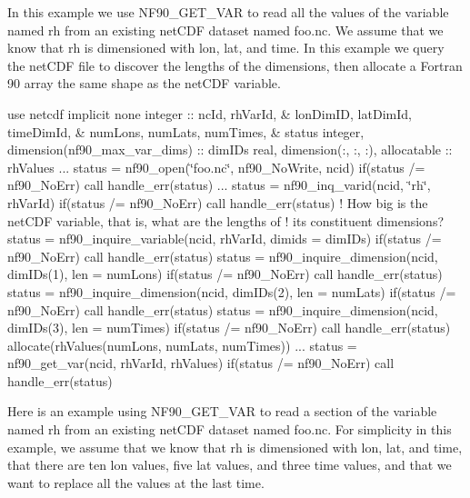In this example we use N\+F90\+\_\+\+G\+E\+T\+\_\+\+V\+AR to read all the values of the variable named rh from an existing net\+C\+DF dataset named foo.\+nc. We assume that we know that rh is dimensioned with lon, lat, and time. In this example we query the net\+C\+DF file to discover the lengths of the dimensions, then allocate a Fortran 90 array the same shape as the net\+C\+DF variable.

use netcdf implicit none integer \+:\+: nc\+Id, rh\+Var\+Id, \& lon\+Dim\+ID, lat\+Dim\+Id, time\+Dim\+Id, \& num\+Lons, num\+Lats, num\+Times, \& status integer, dimension(nf90\+\_\+max\+\_\+var\+\_\+dims) \+:\+: dim\+I\+Ds real, dimension(\+:, \+:, \+:), allocatable \+:\+: rh\+Values ... status = nf90\+\_\+open(\char`\"{}foo.\+nc\char`\"{}, nf90\+\_\+\+No\+Write, ncid) if(status /= nf90\+\_\+\+No\+Err) call handle\+\_\+err(status) ... status = nf90\+\_\+inq\+\_\+varid(ncid, \char`\"{}rh\char`\"{}, rh\+Var\+Id) if(status /= nf90\+\_\+\+No\+Err) call handle\+\_\+err(status) ! How big is the net\+C\+DF variable, that is, what are the lengths of ! its constituent dimensions? status = nf90\+\_\+inquire\+\_\+variable(ncid, rh\+Var\+Id, dimids = dim\+I\+Ds) if(status /= nf90\+\_\+\+No\+Err) call handle\+\_\+err(status) status = nf90\+\_\+inquire\+\_\+dimension(ncid, dim\+I\+Ds(1), len = num\+Lons) if(status /= nf90\+\_\+\+No\+Err) call handle\+\_\+err(status) status = nf90\+\_\+inquire\+\_\+dimension(ncid, dim\+I\+Ds(2), len = num\+Lats) if(status /= nf90\+\_\+\+No\+Err) call handle\+\_\+err(status) status = nf90\+\_\+inquire\+\_\+dimension(ncid, dim\+I\+Ds(3), len = num\+Times) if(status /= nf90\+\_\+\+No\+Err) call handle\+\_\+err(status) allocate(rh\+Values(num\+Lons, num\+Lats, num\+Times)) ... status = nf90\+\_\+get\+\_\+var(ncid, rh\+Var\+Id, rh\+Values) if(status /= nf90\+\_\+\+No\+Err) call handle\+\_\+err(status)

Here is an example using N\+F90\+\_\+\+G\+E\+T\+\_\+\+V\+AR to read a section of the variable named rh from an existing net\+C\+DF dataset named foo.\+nc. For simplicity in this example, we assume that we know that rh is dimensioned with lon, lat, and time, that there are ten lon values, five lat values, and three time values, and that we want to replace all the values at the last time.


